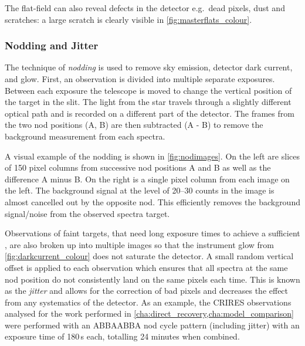 The flat-field can also reveal defects in the detector e.g.\ dead pixels, dust and scratches: a large scratch is clearly visible in \cref{fig:masterflats_colour}.

\subsubsection{Nodding and Jitter}
\label{subsec:nod-jitter}
The technique of \emph{nodding} is used to remove sky emission, detector dark current, and glow.
First, an observation is divided into multiple separate exposures.
Between each exposure the telescope is moved to change the vertical position of the target in the slit.
The light from the star travels through a slightly different optical path and is recorded on a different part of the detector.
The frames from the two nod positions (A, B) are then subtracted (A - B) to remove the background measurement from each spectra.

A visual example of the nodding is shown in \cref{fig:nodimages}.
On the left are slices of 150 pixel columns from successive nod positions A and B as well as the difference A minus B.
On the right is a single pixel column from each image on the left.
The background signal at the level of 20--30 counts in the image is almost cancelled out by the opposite nod.
This efficiently removes the background signal/noise from the observed spectra target.

Observations of faint targets, that need long exposure times to achieve a sufficient \snr{}, are also broken up into multiple images so that the instrument glow from \cref{fig:darkcurrent_colour} does not saturate the detector.
A small random vertical offset is applied to each observation which ensures that all spectra at the same nod position do not consistently land on the same pixels each time.
This is known as the \emph{jitter} and allows for the correction of bad pixels and decreases the effect from any systematics of the detector.
As an example, the {CRIRES} observations analysed for the work performed in \cref{cha:direct_recovery,cha:model_comparison} were performed with an {ABBAABBA} nod cycle pattern (including jitter) with an exposure time of 180\,\si{\second} each, totalling 24 minutes when combined.

